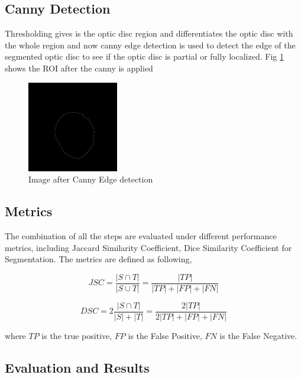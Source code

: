 \documentclass[conference]{IEEEtran}
\begin{document}
\subsection{Canny Detection}
\label{ssec:canny}

Thresholding gives is the optic disc region and differentiates the optic disc with the whole region and now canny edge detection is used to detect the edge of the segmented optic disc to see if the optic disc is partial or fully localized. Fig \ref{fig:canny} shows the ROI after the canny is applied

\begin{figure}[H]
	\centering
	\includegraphics[width=150px]{images/canny.jpg}
	\caption{Image after Canny Edge detection}
	\label{fig:canny}
\end{figure}

\subsection{Metrics}
\label{ssec:metrics}
The combination of all the steps are evaluated under different performance metrics, including Jaccard Similarity Coefficient, Dice Similarity Coefficient for Segmentation. The metrics are defined as following,

\begin{equation}
JSC = \frac{|S \cap T|}{|S \cup T|} = \frac{|TP|}{|TP| + |FP| + |FN|}
\end{equation}

\begin{equation}
DSC = 2\frac{|S \cap T|}{|S| + |T|} = \frac{2|TP|}{2|TP| + |FP| + |FN|}
\end{equation}

where $TP$ is the true positive, $FP$ is the False Positive, $FN$ is the False Negative.

\subsection{Evaluation and Results}
\label{sssec:results}
\end{document}

